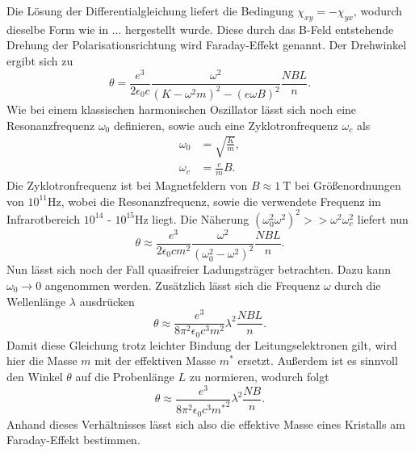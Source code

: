 Die Lösung der Differentialgleichung liefert die Bedingung $\chi_{xy} = -\chi_{yx}$, wodurch dieselbe Form wie in ... hergestellt wurde.
Diese durch das B-Feld entstehende Drehung der Polarisationsrichtung wird Faraday-Effekt genannt.
Der Drehwinkel ergibt sich zu
\begin{equation}
\theta = \frac{e^3}{2 \epsilon_0 c} \frac{\omega^2}{(K - \omega^2 m)^2 - (e\omega B)^2} \frac{NBL}{n}.
\end{equation}
Wie bei einem klassischen harmonischen Oszillator lässt sich noch eine Resonanzfrequenz $\omega_0$ definieren, sowie auch eine Zyklotronfrequenz $\omega_c$ als
\begin{align}
\omega_0 &= \sqrt{\frac{K}{m}}, \\
\omega_c &= \frac{e}{m}B.
\end{align}
Die Zyklotronfrequenz ist bei Magnetfeldern von $B \approx \SI{1}{\tesla}$ bei Größenordnungen von $10^{11}\si{\hertz}$, wobei die Resonanzfrequenz, sowie die verwendete Frequenz im
Infrarotbereich $10^{14}$ - $10^{15}\si{\hertz}$ liegt. Die Näherung $(\omega^2_0 \omega^2)^2 >> \omega^2\omega^2_c$ liefert nun
\begin{equation*}
    \theta \approx \frac{e^3}{2 \epsilon_0 c m^2} \frac{\omega^2}{(\omega^2_0 -\omega^2)^2} \frac{NBL}{n}.
\end{equation*}
Nun lässt sich noch der Fall quasifreier Ladungsträger betrachten. Dazu kann $\omega_0 \to 0$ angenommen werden. Zusätzlich lässt sich die Frequenz $\omega$ durch die Wellenlänge $\lambda$ ausdrücken
\begin{equation}
    \theta \approx \frac{e^3}{8 \pi^2 \epsilon_0 c^3 m^2} \lambda^2 \frac{NBL}{n}.
\end{equation}
Damit diese Gleichung trotz leichter Bindung der Leitungselektronen gilt, wird hier die Masse $m$ mit der effektiven Masse $m^*$ ersetzt. Außerdem ist es sinnvoll
den Winkel $\theta$ auf die Probenlänge $L$ zu normieren, wodurch folgt
\begin{equation}
    \theta \approx \frac{e^3}{8 \pi^2 \epsilon_0 c^3 {m^*}^2} \lambda^2 \frac{NB}{n}.
\end{equation}
Anhand dieses Verhältnisses lässt sich also die effektive Masse eines Kristalls am Faraday-Effekt bestimmen.